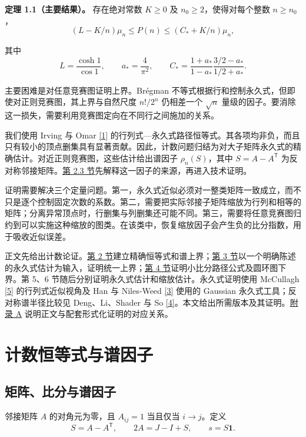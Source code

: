 \documentclass[11pt,a4paper]{article}
\makeatletter
\newcommand{\paperstatement}[3]{\par\addvspace{6pt}\Needspace{4\baselineskip}\phantomsection\def\@currentlabel{#2}\label{#3}\noindent\textbf{#1}\enspace}
\newcommand{\paperref}[2]{\hyperref[#1]{#2}}
\makeatother
\begin{document}
\paperstatement{定理 1.1（主要结果）。}{1.1}{thm-1.1} 存在绝对常数 \(K\ge0\) 及 \(n_0\ge2\)，使得对每个整数 \(n\ge n_0\)，
\[(L-K/n)\mu_n\le P(n)\le(C_*+K/n)\mu_n,\]

其中
\[L=\frac{\cosh1}{\cos1},\qquad
a_*=\frac4{\pi^2},\qquad
C_*=\frac{1+a_*}{1-a_*}\frac{3/2-a_*}{1/2+a_*}.\]

主要困难是对任意竞赛图证明上界。Brégman 不等式根据行和控制永久式，但即使对正则竞赛图，其上界与自然尺度 \(n!/2^n\) 仍相差一个 \(\sqrt n\) 量级的因子。要消除这一损失，需要利用竞赛图定向在不同行之间施加的关系。

我们使用 Irving 与 Omar \paperref{bib-1}{[1]} 的行列式---永久式路径恒等式。其各项均非负，而且只有较小的顶点删集具有显著贡献。因此，计数问题归结为对大子矩阵永久式的精确估计。对近正则竞赛图，这些估计给出谱因子 \(\rho_n(S)\)，其中 \(S=A-A^{\mathsf T}\) 为反对称邻接矩阵。\paperref{sec-2.3}{第 2.3 节}先解释这一因子的来源，再进入技术证明。

证明需要解决三个定量问题。第一，永久式近似必须对一整类矩阵一致成立，而不只是逐个控制固定次数的系数。第二，需要把实际邻接子矩阵缩放为行列和相等的矩阵；分离异常顶点时，行删集与列删集还可能不同。第三，需要将任意竞赛图归约到可以实施这种缩放的图类。在该类中，恢复缩放因子会产生负的比分指数，用于吸收近似误差。

正文先给出计数论证。\paperref{sec-2}{第 2 节}建立精确恒等式和谱上界；\paperref{sec-3}{第 3 节}以一个明确陈述的永久式估计为输入，证明统一上界；\paperref{sec-4}{第 4 节}证明小比分路径公式及圆环图下界。第 5、6 节随后分别证明永久式估计和缩放估计。永久式证明使用 McCullagh \paperref{bib-5}{[5]} 的行列式近似视角及 Han 与 Niles-Weed \paperref{bib-3}{[3]} 使用的 Gaussian 永久式工具；反对称谱半径比较见 Deng、Li、Shader 与 So \paperref{bib-4}{[4]}。本文给出所需版本及其证明。\paperref{sec-A}{附录 A} 说明正文与配套形式化证明的对应关系。

\section{计数恒等式与谱因子}\label{sec-2}

\subsection{矩阵、比分与谱因子}\label{sec-2.1}

邻接矩阵 \(A\) 的对角元为零，且 \(A_{ij}=1\) 当且仅当 \(i\to j\)。定义
\[S=A-A^{\mathsf T},\qquad 2A=J-I+S,\qquad s=S\mathbf1.\]
\end{document}
